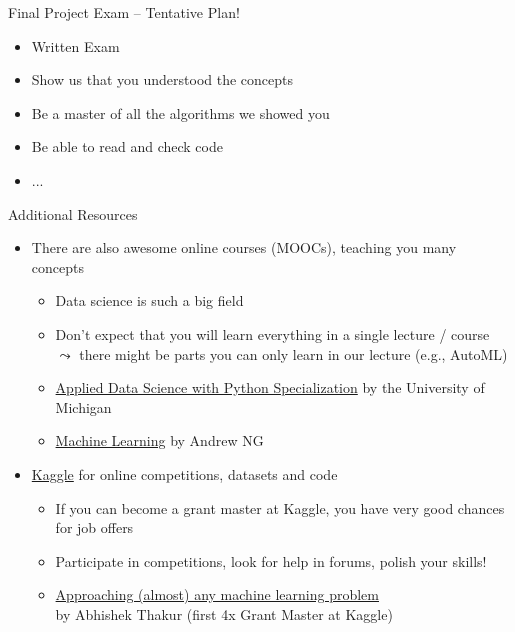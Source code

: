 \documentclass[aspectratio=169]{../latex_main/tntbeamer}  %
\begin{document}
\begin{frame}[c]{Final Project Exam -- Tentative Plan!}

\begin{itemize}
  \item Written Exam
  \item Show us that you understood the concepts
  \item Be a master of all the algorithms we showed you
  \item Be able to read and check code
  \item ...
\end{itemize}

\end{frame}
\begin{frame}[c]{Additional Resources}

\begin{itemize}
  \item There are also awesome online courses (MOOCs), teaching you many concepts
  \begin{itemize}
      \item Data science is such a big field
      \item Don't expect that you will learn everything in a single lecture / course\\ $\leadsto$ there might be parts you can only learn in our lecture (e.g., AutoML)
      \item \href{https://www.coursera.org/specializations/data-science-python}{Applied Data Science with Python Specialization} by the University of Michigan
      \item \href{https://www.coursera.org/learn/machine-learning/home/welcome}{Machine Learning} by Andrew NG
  \end{itemize}
  \item \href{https://www.kaggle.com/}{Kaggle} for online competitions, datasets and code
  \begin{itemize}
      \item If you can become a grant master at Kaggle, you have very good chances for job offers
      \item Participate in competitions, look for help in forums, polish your skills!
      \item \href{https://github.com/abhishekkrthakur/approachingalmost}{Approaching (almost) any machine learning problem}\\ by Abhishek Thakur (first 4x Grant Master at Kaggle)
  \end{itemize}
\end{itemize}

\end{frame}
\end{document}
